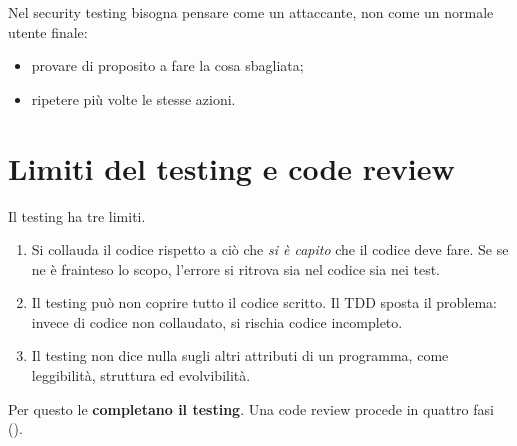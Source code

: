 \begin{idea}
Nel security testing bisogna pensare come un attaccante, non come un normale utente finale:
\begin{itemize}
  \item provare di proposito a fare la cosa sbagliata;
  \item ripetere più volte le stesse azioni.
\end{itemize}
\end{idea}

\section{Limiti del testing e code review}
\label{sec:test-review}

Il testing ha tre limiti.
\begin{enumerate}
  \item Si collauda il codice rispetto a ciò che \emph{si è capito} che il codice deve fare. Se se ne è frainteso lo
    scopo, l'errore si ritrova sia nel codice sia nei test.
  \item Il testing può non coprire tutto il codice scritto. Il TDD sposta il problema: invece di codice non collaudato,
    si rischia codice incompleto.
  \item Il testing non dice nulla sugli altri attributi di un programma, come leggibilità, struttura ed evolvibilità.
\end{enumerate}

Per questo le  \textbf{completano il testing}. Una code review procede in quattro fasi
().

